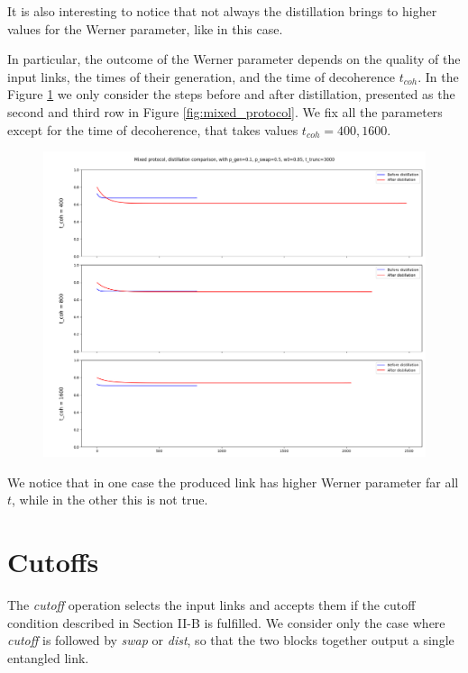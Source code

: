 \documentclass{masterthesis}
\begin{document}
It is also interesting to notice that not always the distillation brings to higher values for the Werner parameter, like in this case.

In particular, the outcome of the Werner parameter depends on the quality of the input links, the times of their generation, and the time of decoherence $t_{coh}$. 
In the Figure \ref{fig:mixed_protocol_dist_comparison} we only consider the steps before and after distillation, presented as the second and third row in Figure \ref{fig:mixed_protocol}. We fix all the parameters except for the time of decoherence, that takes values $t_{coh} = {400, 1600}$.

\begin{figure}[ht]
    \centering
    \includegraphics[width=1\linewidth]{images/mixed_protocol_dist_comp.png}
    \caption{}
    \label{fig:mixed_protocol_dist_comparison} 
\end{figure}

We notice that in one case the produced link has higher Werner parameter far all $t$, while in the other this is not true.

\newpage
\section*{Cutoffs}

The \textit{cutoff} operation selects the input links and accepts them if the cutoff condition described in Section II-B is fulfilled. We consider only the case where \textit{cutoff} is followed by \textit{swap} or \textit{dist}, so that the two blocks together output a single entangled link.
\end{document}
